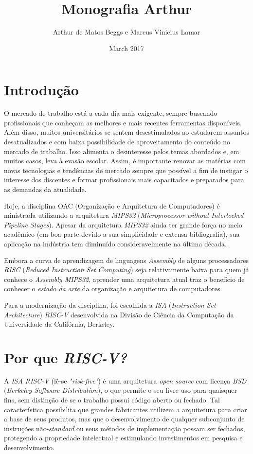 \documentclass{article}
\title{Monografia Arthur}
\author{Arthur de Matos Beggs e Marcus Vinicius Lamar}
\date{March 2017}
\begin{document}
\maketitle

\break

\section{Introdução}

    {O mercado de trabalho está a cada dia mais exigente, sempre buscando profissionais que conheçam as melhores e mais recentes ferramentas disponíveis. Além disso, muitos universitários se sentem desestimulados ao estudarem assuntos desatualizados e com baixa possibilidade de aproveitamento do conteúdo no mercado de trabalho. Isso alimenta o desinteresse pelos temas abordados e, em muitos casos, leva à evasão escolar. Assim, é importante renovar as matérias com novas tecnologias e tendências de mercado sempre que possível a fim de instigar o interesse dos discentes e formar profissionais mais capacitados e preparados para as demandas da atualidade.}

    {Hoje, a disciplina OAC (Organização e Arquitetura de Computadores) é ministrada utilizando a arquitetura \textit{MIPS32} (\textit{Microprocessor without Interlocked Pipeline Stages}). Apesar da arquitetura \textit{MIPS32} ainda ter grande força no meio acadêmico (em boa parte devido a sua simplicidade e extensa bibliografia), sua aplicação na indústria tem diminuído consideravelmente na última década.}

    {Embora a curva de aprendizagem de linguagens \textit{Assembly} de alguns processadores \textit{RISC} (\textit{Reduced Instruction Set Computing}) seja relativamente baixa para quem já conhece o \textit{Assembly MIPS32}, aprender uma arquitetura atual traz o benefício de conhecer o \textit{estado da arte} da organização e arquitetura de computadores.}

    {Para a modernização da disciplina, foi escolhida a \textit{ISA} (\textit{Instruction Set Architecture}) \textit{RISC-V} desenvolvida na Divisão de Ciência da Computação da Universidade da Califórnia, Berkeley.}


\section{Por que \textit{RISC-V?}}

    {A \textit{ISA RISC-V} (lê-se \textit{"risk-five"}) é uma arquitetura \textit{open source} com licença \textit{BSD} (\textit{Berkeley Software Distribution}), o que permite o seu livre uso para quaisquer fins, sem distinção de se o trabalho possui código aberto ou fechado. Tal característica possibilita que grandes fabricantes utilizem a arquitetura para criar a base de seus produtos, mas que o desenvolvimento de qualquer subconjunto de instruções não-\textit{standard} ou seus métodos de implementação possam ser fechados, protegendo a propriedade intelectual e estimulando investimentos em pesquisa e desenvolvimento.}
\end{document}
